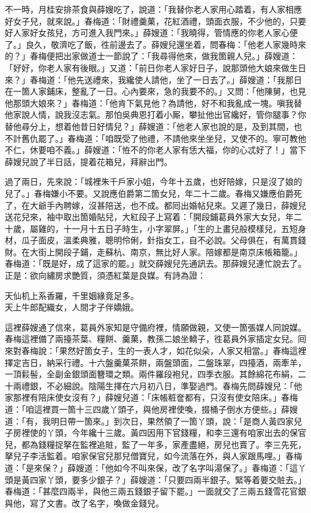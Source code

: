 不一時，月桂安排茶食與薛嫂吃了，說道：「我替你老人家用心踏着，有人家相應好女子兒，就來說。」春梅道：「財禮羹菓，花紅酒禮，頭面衣服，不少他的，只要好人家好女孩兒，方可進入我門來。」薛嫂道：「我曉得，管情應的你老人家心便了。」良久，敬濟吃了飯，徃前邊去了。薛嫂兒還坐着，問春梅：「他老人家幾時來的？」春梅便把出家做道士一節說了：「我尋得他來，做我箇親人兒。」薛嫂道：「好好，你老人家有後眼。」又道：「前日你老人家好日子，說那頭他大娘來做生日來？」春梅道：「他先送禮來，我纔使人請他，坐了一日去了。」薛嫂道：「我那日在一箇人家鋪床，整亂了一日。心內要來，急的我要不的。」又問：「他陳舅，也見他那頭大娘來？」春梅道：「他肯下氣見他？為請他，好不和我亂成一塊。嗔我替他家說人情，說我沒志氣。那怕吳典恩打着小厮，攀扯他出官纔好，管你腿事？你替他尋分上，想着他昔日好情兒？」薛嫂道：「他老人家也說的是，及到其間，也不計舊仇罷了。」春梅道：「咱既受了他禮，不請他來坐坐兒，又使不的。寧可教他不仁，休要咱不義。」薛嫂道：「恠不的你老人家有恁大福，你的心忒好了！」{}當下薛嫂兒說了半日話，提着花箱兒，拜辭出門。

過了兩日，先來說：「城裡朱千戶家小姐，今年十五歲，也好陪嫁，只是沒了娘的兒了。」春梅嫌小不要。又說應伯爵第二箇女兒，年二十二歲。春梅又嫌應伯爵死了，{}在大爺手內聘嫁，沒甚陪送，也不成。都囘出婚帖兒來。又遲了幾日，薛嫂兒送花兒來，袖中取出箇婚貼兒，大紅段子上寫着：「開段鋪葛員外家大女兒，年二十歲，屬雞的，十一月十五日子時生，小字翠屏。」「生的上畫兒般模樣兒，五短身材，瓜子面皮，溫柔典雅，聰明伶俐，針指女工，自不必說。父母俱在，有萬貫錢財。在大街上開段子鋪，走蘇杭、南京，無比好人家。陪嫁都是南京床帳箱籠。」春梅道：「既是好，成了這家的罷。」就交薛嫂兒先通訊去。那薛嫂兒連忙說去了。正是：欲向繡房求艷質，須憑紅葉是良媒。有詩為證：

\begin{myquote}
天仙机上系香羅，千里姻緣竟足多。\\天上牛郎配織女，人間才子伴嬌娥。
\end{myquote}

這裡薛嫂通了信來，葛員外家知是守備府裡，情願做親，又使一箇張媒人同說媒。春梅這裡備了兩擡茶葉、糧餅、羹菓，教孫二娘坐轎子，徃葛員外家插定女兒。囘來對春梅說：「果然好箇女子，生的一表人才，如花似朵，人家又相當。」春梅這裡擇定吉日，納采行禮。十六盤羹菓茶餅，兩盤頭面，二盤珠翠，四擡酒，兩牽羊，一頂鬏髻，全副金銀頭面簪環之類。兩件羅段袍兒，四季衣服。其餘綿花布絹，二十兩禮銀，不必細說。陰陽生擇在六月初八日，準娶過門。春梅先問薛嫂兒：「他家那裡有陪床使女沒有？」薛嫂兒道：「床帳粧奩都有，只沒有使女陪床。」春梅道：「咱這裡買一箇十三四歲丫頭子，與他房裡使喚，掇桶子倒水方便些。」薛嫂道：「有，我明日帶一箇來。」到次日，果然領了一箇丫頭，說：「是商人黃四家兒子房裡使的丫頭，今年纔十三歲。黃四因用下官錢糧，和李三還有咱家出去的保官兒，都為錢糧捉拏在監裡追賍，監了一年多，家產盡絕，房兒也賣了。李三先死，拏兒子李活監着。咱家保官兒那兒僧寶兒，如今流落在外，與人家跟馬哩。」{}春梅道：「是來保？」薛嫂道：「他如今不叫來保，改了名字叫湯保了。」春梅道：「這丫頭是黃四家丫頭，要多少銀子？」薛嫂道：「只要四兩半銀子。緊等着要交賍去。」春梅道：「甚麼四兩半，與他三兩五錢銀子留下罷。」一面就交了三兩五錢雪花官銀與他，寫了文書。改了名字，喚做金錢兒。

